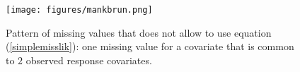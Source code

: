 \documentclass[12pt,a4paper]{report}
\begin{document}
		
		
%		
		\begin{figure} 
		\centering
		\texttt{[image: figures/mankbrun.png]} 
		\caption{Pattern of missing values that does not allow to use equation (\ref{simplemisslik}): one missing value for a covariate that is common to $2$ observed response covariates.} \label{mankbrun}
		\end{figure}
\end{document}
